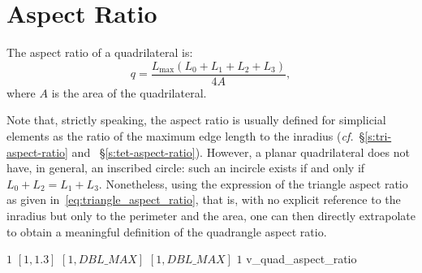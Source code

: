 \section{Aspect Ratio\label{s:quad-aspect-ratio}}

The aspect ratio of a quadrilateral is: 
\[
q = \frac{L_{\max}(L_0+L_1+L_2+L_3)}{4A},
\]
where $A$ is the area of the quadrilateral. 

Note that, strictly speaking, the aspect ratio is usually defined for
simplicial elements as the ratio of the maximum edge length to the
inradius (\emph{cf.}~\S\ref{s:tri-aspect-ratio} and
~\S\ref{s:tet-aspect-ratio}). However, a planar quadrilateral does not
have, in general, an inscribed circle: such an incircle exists if and
only if $L_0+L_2=L_1+L_3$. Nonetheless, using the expression
of the triangle aspect ratio as given
in~\eqref{eq:triangle_aspect_ratio}, that is, with no explicit
reference to the inradius but only to the perimeter and the area, one
can then directly extrapolate to obtain a meaningful definition of the
quadrangle aspect ratio.

%
{$1$}%
{$[1,1.3]$}%
{$[1,DBL\_MAX]$}%
{$[1,DBL\_MAX]$}%
{$1$}%
{\cite{pebay:04}}%
{v\_quad\_aspect\_ratio}%

